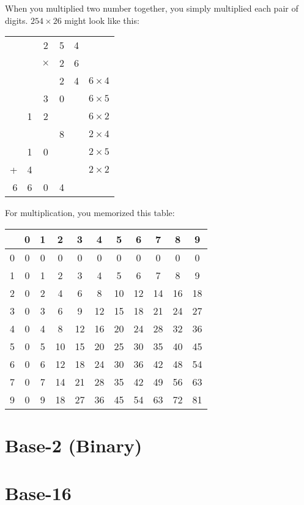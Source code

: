 When you multiplied two number together, you simply multiplied each
pair of digits. $254 \times 26$ might look like this:

\begin{tabular} {r c c c c | c}
 & & 2 & 5 & 4 & \\
 & & $\times$ & 2 & 6 & \\
 \hline
& &  & 2 & 4 & $6 \times 4$\\
& & 3 & 0 & & $6 \times 5$ \\
& 1 & 2 & & & $6 \times 2$ \\
& & & 8 & & $2 \times 4$ \\
& 1 & 0 & & & $2 \times 5$\\
+ & 4 & & & & $2 \times 2$\\
 \hline
 6 & 6 & 0 & 4
 \end{tabular}
 

For multiplication, you memorized this table:

\begin{tabular}{ c || c | c | c | c | c | c| c| c| c| c}
 & 0 & 1 & 2 & 3 & 4 & 5 & 6 & 7 & 8 & 9 \\
 \hline
 0 & 0 & 0 & 0 & 0 & 0 & 0 & 0 & 0 & 0 & 0 \\
 1 & 0 & 1 & 2 & 3 & 4 & 5 & 6 & 7 & 8 & 9 \\
 2 & 0 & 2 & 4 & 6 & 8 & 10 & 12 & 14 & 16 & 18 \\
 3 & 0 & 3 & 6 & 9 & 12 & 15 & 18 & 21 & 24 & 27 \\
 4 & 0 & 4 & 8 & 12 & 16 & 20 & 24 & 28 & 32 & 36 \\
 5 & 0 & 5 & 10 & 15 & 20 & 25 & 30 & 35 & 40 & 45 \\
 6 & 0 & 6 & 12 & 18 & 24 & 30 & 36 & 42 & 48 & 54 \\
 7 & 0 & 7 & 14 & 21 & 28 & 35 & 42 & 49 & 56 & 63 \\
 9 & 0 & 9 & 18 & 27 & 36 & 45 & 54 & 63 & 72 & 81 
 \end{tabular}

\section{Base-2 (Binary)}

\section{Base-16}